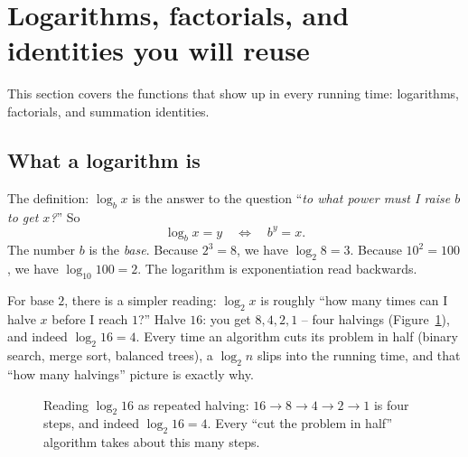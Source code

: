 \section{Logarithms, factorials, and identities you will reuse}
\label{ch39:logs-factorials}

This section covers the functions that show up in every running time: logarithms, factorials, and summation identities.

\subsection{What a logarithm is}

The definition: $\log_b x$ is the answer to the question
``\emph{to what power must I raise $b$ to get $x$?}'' So
\[
\log_b x = y \quad\Longleftrightarrow\quad b^y = x.
\]
The number $b$ is the \emph{base}. Because $2^3 = 8$, we have $\log_2 8 = 3$.
Because $10^2 = 100$, we have $\log_{10} 100 = 2$. The logarithm is exponentiation read backwards.

\begin{intuitionbox}
For base $2$, there is a simpler reading: $\log_2 x$ is roughly ``how many times can I halve $x$ before I reach
$1$?'' Halve $16$: you get $8, 4, 2, 1$ -- four halvings (Figure~\ref{ch39:fig-loghalve}),
and indeed
$\log_2 16 = 4$. Every time an algorithm cuts its problem in half (binary search,
merge sort, balanced trees), a $\log_2 n$ slips into the running time, and that
``how many halvings'' picture is exactly why.
\end{intuitionbox}

\begin{figure}[H]
\begin{center}
\end{center}
\caption{Reading $\log_2 16$ as repeated halving: $16 \to 8 \to 4 \to 2 \to 1$ is
four steps, and indeed $\log_2 16 = 4$. Every ``cut the problem in half'' algorithm
takes about this many steps.}
\label{ch39:fig-loghalve}
\end{figure}

